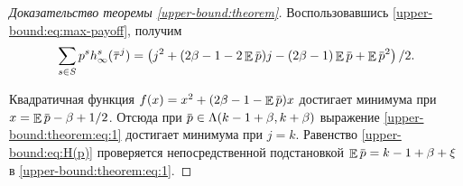 \documentclass[12pt, draft]{extarticle}
\newcommand{\overbar}[1]%
{\mkern 1.5mu\overline{\mkern-1.3mu#1\mkern-1.3mu}\mkern 1.3mu}
\newcommand{\p}{\ensuremath{\overbar{p}}}
\DeclareMathOperator{\E}{\mathbb{E}}
\newcommand{\tauv}{\ensuremath{\overbar{\tau}}}
\begin{document}
\begin{proof}[Доказательство теоремы \ref{upper-bound:theorem}]
  Воспользовавшись \eqref{upper-bound:eq:max-payoff}, получим
  \begin{equation}
    \label{upper-bound:theorem:eq:1}
    \sum_{s \in S} p^s h^s_\infty(\tauv^j) =
    \left(
      j^2 + (2\beta - 1 - 2 \E \p)j - (2\beta - 1) \E \p + \E \p^2
    \right)/2.
  \end{equation}
  
  Квадратичная функция $f(x) = x^2 + (2\beta - 1 - \E \p)x$
  достигает минимума при $x = \E \p - \beta + 1/2$. Отсюда при $\p \in \Lambda(k
  - 1 + \beta, k + \beta)$ выражение \eqref{upper-bound:theorem:eq:1} достигает
  минимума при $j = k$. Равенство \eqref{upper-bound:eq:H(p)} проверяется
  непосредственной подстановкой $\E \p = k - 1 + \beta + \xi$ в
  \eqref{upper-bound:theorem:eq:1}.
\end{proof}
\end{document}
